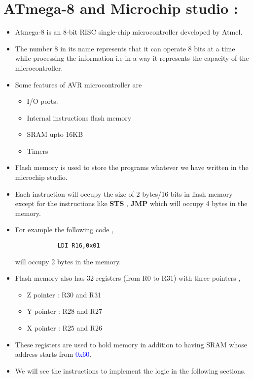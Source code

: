 \documentclass{article}
\begin{document}
\section*{ATmega-8 and Microchip studio :}
\begin{itemize}
    \item Atmega-8 is an 8-bit RISC single-chip microcontroller developed by Atmel.
    \item The number 8 in its name represents that it can operate 8 bits at a time while processing the information i.e in a way it represents the capacity of the microcontroller.
    \item Some features of AVR microcontroller are
    \begin{itemize}
        \item I/O ports.
        \item Internal instructions flash memory
        \item SRAM upto 16KB
        \item Timers
    \end{itemize}
    \item Flash memory is used to store the programs whatever we have written in the microchip studio.
    \item Each instruction will occupy the size of 2 bytes/16 bits in flash memory except for the instructions like \textbf{STS} , \textbf{JMP} which will occupy 4 bytes in the memory.
    \item For example the following code ,
    {\renewcommand\fcolorbox[4][]{\textcolor{cyan}{\strut#4}}
        \begin{verbatim}
            LDI R16,0x01
        \end{verbatim}
    }
    will occupy 2 bytes in the memory.
    \item Flash memory also has 32 registers (from R0 to R31) with three pointers ,
    \begin{itemize}
        \item Z pointer : R30 and R31
        \item Y pointer : R28 and R27
        \item X pointer : R25 and R26
    \end{itemize}
    \item These registers are used to hold memory in addition to having SRAM whose address starts from \textcolor{blue}{0x60}.
    \item We will see the instructions to implement the logic in the following sections.
\end{itemize}


\end{document}
